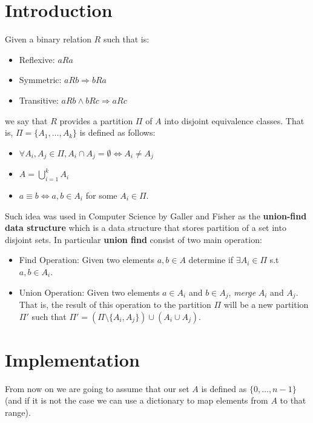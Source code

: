 \section{Introduction}

Given a binary relation $R$ such that is:
\begin{itemize}
    \item Reflexive: $a R a$
    \item Symmetric: $a R b \Rightarrow b R a$
    \item Transitive: $a R b \land b R c \Rightarrow a R c$
\end{itemize}

we say that $R$ provides a partition $\Pi$ of $A$ into disjoint equivalence classes. That is, $\Pi = \{A_1, \ldots, A_k\}$ is defined as follows:

\begin{itemize}
    \item $\forall A_i, A_j \in \Pi, A_i \cap A_j = \emptyset \iff A_i \neq A_j$
    \item $A = \bigcup\limits_{i = 1}^{k} A_i$
    \item $a \equiv b \iff a,b \in A_i$ for some $A_i \in \Pi$.
\end{itemize}


Such idea was used in Computer Science by Galler and Fisher\cite{galler1964improved} as the \textbf{union-find data structure} which is a data structure that stores partition of a set into disjoint sets. In particular \textbf{union find} consist of two main operation:

\begin{itemize}
    \item Find Operation: Given two elements $a,b \in A$ determine if $\exists A_i \in \Pi$ s.t $a,b \in A_i$.
    \item Union Operation: Given two elements $a \in A_i$ and $b \in A_j$, \textit{merge} $A_i$ and $A_j$. That is, the result of this operation to the partition $\Pi$ will be a new partition $\Pi'$ such that $\Pi' = (\Pi \setminus \{A_i, A_j\}) \cup (A_i \cup A_j)$.
\end{itemize}

\section{Implementation}
From now on we are going to assume that our set $A$ is defined as $\{0, \ldots, n-1\}$ (and if it is not the case we can use a dictionary to map elements from $A$ to that range).

